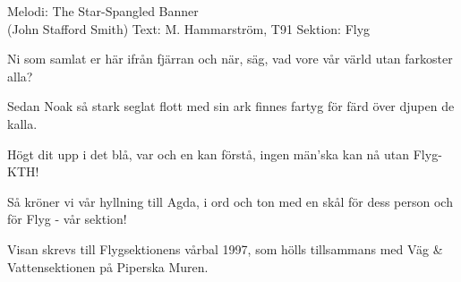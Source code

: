 \begin{song}

\begin{songmeta}
Melodi: The Star-Spangled Banner \\ (John Stafford Smith)
Text: M. Hammarström, T91
Sektion: Flyg
\end{songmeta}

\begin{songtext}
Ni som samlat er här
ifrån fjärran och när,
säg, vad vore vår värld
utan farkoster alla?

Sedan Noak så stark
seglat flott med sin ark
finnes fartyg för färd
över djupen de kalla.

Högt dit upp i det blå,
var och en kan förstå,
ingen män'ska kan nå
utan Flyg-KTH!

Så kröner vi vår hyllning
till Agda, i ord och ton
med en skål för dess person
och för Flyg - vår sektion!
\end{songtext}

\begin{songnotes}
Visan skrevs till Flygsektionens vårbal 1997, som hölls tillsammans med Väg \& Vattensektionen på Piperska Muren.
\end{songnotes}

\end{song}
